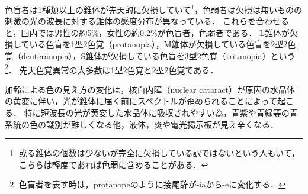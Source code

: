\documentclass[uplatex,paper=a4,fontsize=4.0truemm,jafontsize=4.0truemm,head_space=30.0truemm,foot_space=30.0truemm,baselineskip=8.0truemm,line_length=40zw,gutter=25.0truemm,oneside,openany,fleqn,hanging_panctuation,open_bracket_pos=nibu_tentsuki,dvipdfmx,jis2004,book,titlepage]{jlreq}
\theoremstyle{mystyle}
\begin{document}
			色盲者は1種類以上の錐体が先天的に欠損していて\footnote{或る錐体の個数は少ないが完全に欠損している訳ではないという人もいて，こちらは軽度であれば色弱に含めることがある．}，色弱者は欠損は無いものの刺激の光の波長に対する錐体の感度分布が異なっている．
			これらを合わせると，国内では男性の約5\%，女性の約0.2\%が色盲者，色弱者である\cite[p.~4]{doctors2019}．
			L錐体が欠損している色盲を1型2色覚（protanopia），M錐体が欠損している色盲を2型2色覚（deuteranopia），S錐体が欠損している色盲を3型2色覚（tritanopia）という\footnote{色盲者を表す時は，protanopeのように接尾辞が-iaから-eに変化する．}．
			先天色覚異常の大多数は1型2色覚と2型2色覚である\cite[p.~9]{doctors2014}．

			加齢による色の見え方の変化は，核白内障（nuclear cataract）が原因の水晶体の黄変に伴い，光が錐体に届く前にスペクトルが歪められることによって起こる．
			特に短波長の光が黄変した水晶体に吸収されやすい為，青紫や青緑等の青系統の色の識別が難しくなる他，液体，炎や電光掲示板が見え辛くなる\cite{Ishihara1998}．
\end{document}

